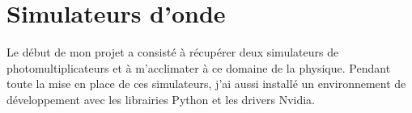 




\section{Simulateurs d'onde}
Le début de mon projet a consisté à récupérer deux simulateurs de photomultiplicateurs et à m'acclimater à ce domaine de la physique.
Pendant toute la mise en place de ces simulateurs, j'ai aussi installé un environnement de développement avec les librairies Python et les drivers Nvidia.

